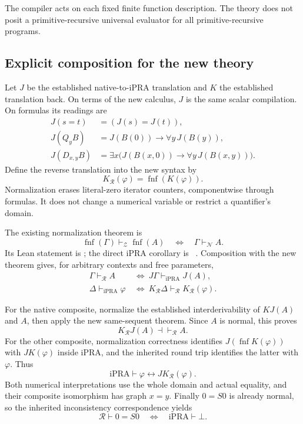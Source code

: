 \documentclass[11pt,a4paper]{article}
\theoremstyle{definition}
\newcommand{\iPRA}{\mathrm{iPRA}}
\newcommand{\fnf}{\operatorname{fnf}}
\newcommand{\file}[1]{\texttt{\detokenize{#1}}}
\newcommand{\Rcal}{\mathcal R}
\newcommand{\Zcal}{\mathcal Z}
\begin{document}
The compiler acts on each fixed finite function description. The theory
does not posit a primitive-recursive universal evaluator for all
primitive-recursive programs.

\subsection{Explicit composition for the new theory}

Let \(J\) be the established native-to-iPRA translation and \(K\) the
established translation back. On terms of the new calculus, \(J\)
is the same scalar compilation. On formulas its readings are
\begin{align*}
 J(s=t)&=(J(s)=J(t)),\\
 J(Q_yB)&=J(B(0))\to\forall y\,J(B(y)),\\
 J(D_{x,y}B)&=\exists x\bigl(J(B(x,0))\to
                          \forall y\,J(B(x,y))\bigr).
\end{align*}
Define the reverse translation into the new syntax by
\[
                         K_{\Rcal}(\varphi)=\fnf(K(\varphi)).
\]
Normalization erases literal-zero iterator counters, componentwise
through formulas. It does not change a numerical variable or restrict
a quantifier's domain.

The existing normalization theorem is
\[
 \fnf(\Gamma)\vdash_{\Zcal}\fnf(A)
 \quad\Longleftrightarrow\quad
 \Gamma\vdash_{\mathcal N} A.
\]
Its Lean statement is \file{nzprf_iff_nprf}; the direct iPRA corollary
is \file{nzprf_iff_pra}~\cite{normal}. Composition with the new theorem
gives, for arbitrary contexts and free parameters,
\begin{align*}
 \Gamma\vdash_{\Rcal} A
 &\ \Longleftrightarrow\
   J\Gamma\vdash_{\iPRA}J(A),\\
 \Delta\vdash_{\iPRA}\varphi
 &\ \Longleftrightarrow\
   K_{\Rcal}\Delta\vdash_{\Rcal}K_{\Rcal}(\varphi).
\end{align*}

For the native composite, normalize the established interderivability
of \(KJ(A)\) and \(A\), then apply the new same-sequent theorem.
Since \(A\) is normal, this proves
\[
                  K_{\Rcal}J(A)\dashv\vdash_{\Rcal}A.
\]
For the other composite, normalization correctness identifies
\(J(\fnf K(\varphi))\) with \(JK(\varphi)\) inside iPRA, and the inherited
round trip identifies the latter with \(\varphi\). Thus
\[
       \iPRA\vdash \varphi\leftrightarrow J K_{\Rcal}(\varphi).
\]
Both numerical interpretations use the whole domain and actual equality,
and their composite isomorphism has graph \(x=y\). Finally \(0=S0\)
is already normal, so the inherited inconsistency correspondence yields
\[
  \Rcal\vdash 0=S0
  \quad\Longleftrightarrow\quad
  \iPRA\vdash\bot.
\]
\end{document}
